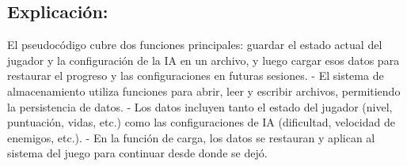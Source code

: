 \subsection*{Explicación:}
El pseudocódigo cubre dos funciones principales: guardar el estado actual del jugador y la configuración de la IA en un archivo, y luego cargar esos datos para restaurar el progreso y las configuraciones en futuras sesiones.
- El sistema de almacenamiento utiliza funciones para abrir, leer y escribir archivos, permitiendo la persistencia de datos.
- Los datos incluyen tanto el estado del jugador (nivel, puntuación, vidas, etc.) como las configuraciones de IA (dificultad, velocidad de enemigos, etc.).
- En la función de carga, los datos se restauran y aplican al sistema del juego para continuar desde donde se dejó.
